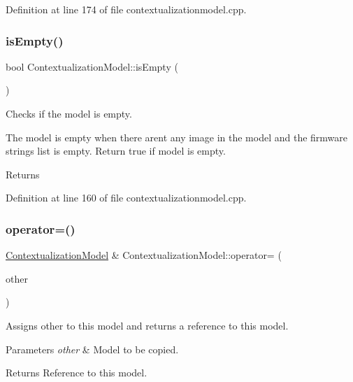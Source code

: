Definition at line 174 of file contextualizationmodel.\+cpp.

\mbox{\label{classContextualizationModel_a0d5c107172b0d2e4026cae63d3193f4e}} 
\subsubsection{\texorpdfstring{is\+Empty()}{isEmpty()}}
{\footnotesize\ttfamily bool Contextualization\+Model\+::is\+Empty (\begin{DoxyParamCaption}{ }\end{DoxyParamCaption})}



Checks if the model is empty. 

The model is empty when there aren\textquotesingle{}t any image in the model and the firmware strings list is empty. Return true if model is empty. \begin{DoxyReturn}{Returns}

\end{DoxyReturn}


Definition at line 160 of file contextualizationmodel.\+cpp.

\mbox{\label{classContextualizationModel_a7c8d0dea4d32c2b573f1f58b0c01b81b}} 
\subsubsection{\texorpdfstring{operator=()}{operator=()}}
{\footnotesize\ttfamily \mbox{\hyperlink{classContextualizationModel}{Contextualization\+Model}} \& Contextualization\+Model\+::operator= (\begin{DoxyParamCaption}\item[{\mbox{\hyperlink{classContextualizationModel}{Contextualization\+Model}} \&}]{other }\end{DoxyParamCaption})}



Assigns other to this model and returns a reference to this model. 


\begin{DoxyParams}{Parameters}
{\em other} & Model to be copied. \\
\hline
\end{DoxyParams}
\begin{DoxyReturn}{Returns}
Reference to this model. 
\end{DoxyReturn}


